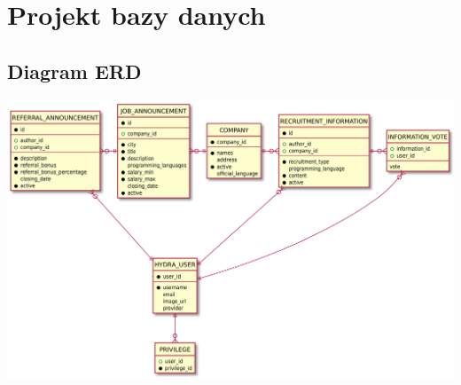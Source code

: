 \documentclass[oneside]{scrreprt}
\begin{document}
\chapter{Projekt bazy danych}

\section{Diagram ERD}
\includegraphics[width=\textwidth, keepaspectratio]{graphics/hydra_db_erd.pdf}

\clearpage
\end{document}
